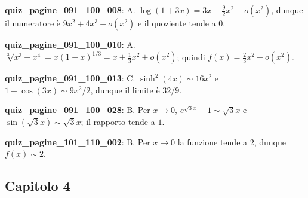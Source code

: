\documentclass[11pt,a4paper]{article}
\newcounter{quiz}
\begin{document}
\noindent\textbf{quiz\_pagine\_091\_100\_008}: A. $\log(1+3x)=3x-\frac92x^2+o(x^2)$, dunque il numeratore è $9x^2+4x^3+o(x^2)$ e il quoziente tende a $0$.\par\medskip
\noindent\textbf{quiz\_pagine\_091\_100\_010}: A. $\sqrt[3]{x^3+x^4}=x(1+x)^{1/3}=x+\frac13x^2+o(x^2)$; quindi $f(x)=\frac23x^2+o(x^2)$.\par\medskip
\noindent\textbf{quiz\_pagine\_091\_100\_013}: C. $\sinh^2(4x)\sim16x^2$ e $1-\cos(3x)\sim9x^2/2$, dunque il limite è $32/9$.\par\medskip
\noindent\textbf{quiz\_pagine\_091\_100\_028}: B. Per $x\to0$, $e^{\sqrt3x}-1\sim\sqrt3x$ e $\sin(\sqrt3x)\sim\sqrt3x$; il rapporto tende a $1$.\par\medskip
\noindent\textbf{quiz\_pagine\_101\_110\_002}: B. Per $x\to0$ la funzione tende a $2$, dunque $f(x)\sim2$.\par\medskip
\subsection*{Capitolo 4}
\end{document}
